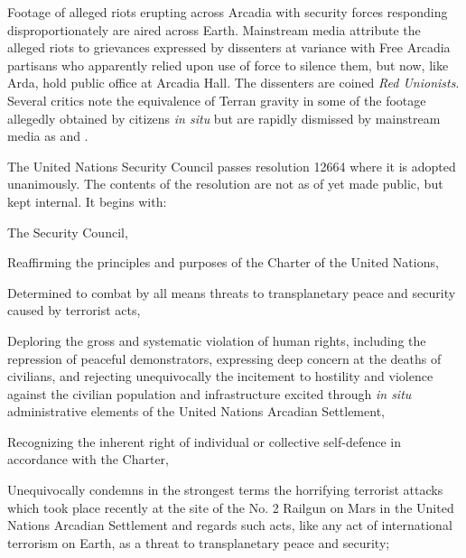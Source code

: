 

Footage of alleged riots erupting across Arcadia with security forces responding disproportionately are aired across Earth. Mainstream media attribute the alleged riots to grievances expressed by dissenters at variance with Free Arcadia partisans who apparently relied upon use of force to silence them, but now, like Arda, hold public office at Arcadia Hall. The dissenters are coined {\it Red Unionists}. Several critics note the equivalence of Terran gravity in some of the footage allegedly obtained by citizens {\it in situ} but are rapidly dismissed by mainstream media as  and .
\StopTimelineDate

The United Nations Security Council passes resolution 12664 where it is adopted unanimously. The contents of the resolution are not as of yet made public, but kept internal. It begins with:

\startTimelineGeneralDocument
The Security Council,

Reaffirming the principles and purposes of the Charter of the United Nations,

Determined to combat by all means threats to transplanetary peace and security caused by terrorist acts,

Deploring the gross and systematic violation of human rights, including the repression of peaceful demonstrators, expressing deep concern at the deaths of civilians, and rejecting unequivocally the incitement to hostility and violence against the civilian population and infrastructure excited through {\it in situ} administrative elements of the United Nations Arcadian Settlement,

Recognizing the inherent right of individual or collective self-defence in accordance with the Charter,

\startitemize[n]
\setupwhitespace[big]
\item Unequivocally condemns in the strongest terms the horrifying terrorist attacks which took place recently at the site of the No. \type{#}2 Railgun on Mars in the United Nations Arcadian Settlement and regards such acts, like any act of international terrorism on Earth, as a threat to transplanetary peace and security;

